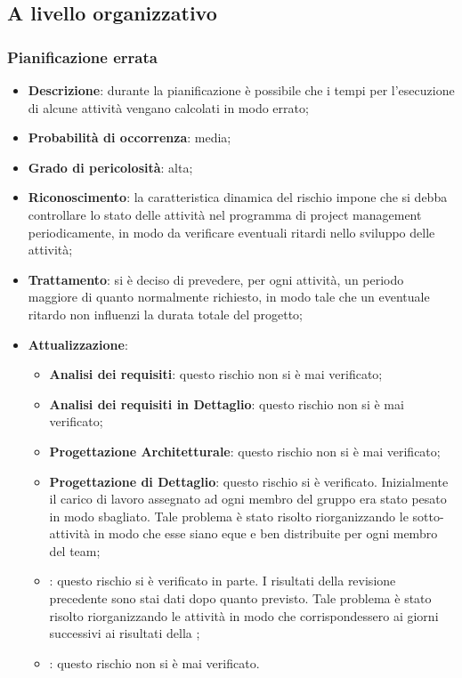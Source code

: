 	\subsection{A livello organizzativo}
		
		\subsubsection{Pianificazione errata}
		\begin{itemize}
			\item \textbf{Descrizione}: durante la pianificazione è possibile che i tempi per l'esecuzione di alcune attività vengano calcolati in modo errato;
			\item \textbf{Probabilità di occorrenza}: media;
			\item \textbf{Grado di pericolosità}: alta;
			\item \textbf{Riconoscimento}: la caratteristica dinamica del rischio impone che si debba controllare lo stato delle attività nel programma di project management periodicamente, in modo da verificare eventuali ritardi nello sviluppo delle attività;	
			\item \textbf{Trattamento}: si è deciso di prevedere, per ogni attività, un periodo maggiore di quanto normalmente richiesto, in modo tale che un eventuale ritardo non influenzi la durata totale del progetto;
			\item \textbf{Attualizzazione}:
			\begin{itemize}
				\item \textbf{Analisi dei requisiti}: questo rischio non si è mai verificato;
				\item \textbf{Analisi dei requisiti in Dettaglio}: questo rischio non si è mai verificato;
				\item \textbf{Progettazione Architetturale}: questo rischio non si è mai verificato;
				\item \textbf{Progettazione di Dettaglio}: questo rischio si è verificato. Inizialmente il carico di lavoro assegnato ad ogni membro del gruppo era stato pesato in modo sbagliato. Tale problema è stato risolto riorganizzando le sotto-attività in modo che esse siano eque e ben distribuite per ogni membro del team;
				\item \textbf{\CO}: questo rischio si è verificato in parte. I risultati della revisione precedente sono stai dati dopo quanto previsto. Tale problema è stato risolto riorganizzando le attività in modo che corrispondessero ai giorni successivi ai risultati della \textit{\RR};
				\item \textbf{\VV}: questo rischio non si è mai verificato. 
			\end{itemize}
		\end{itemize}
	
